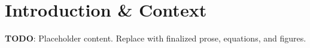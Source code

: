
\section{Introduction & Context}
\label{sec:introduction-context}

\textbf{TODO}: Placeholder content. Replace with finalized prose, equations, and figures.

